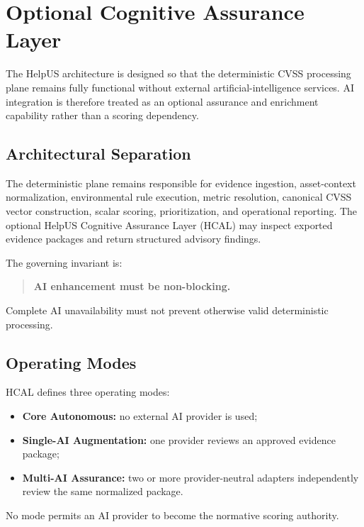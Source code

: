 \chapter{Optional Cognitive Assurance Layer}
\label{ch:optional_ai_assurance}

The HelpUS architecture is designed so that the deterministic CVSS processing plane remains fully functional without external artificial-intelligence services. AI integration is therefore treated as an optional assurance and enrichment capability rather than a scoring dependency.

\section{Architectural Separation}

The deterministic plane remains responsible for evidence ingestion, asset-context normalization, environmental rule execution, metric resolution, canonical CVSS vector construction, scalar scoring, prioritization, and operational reporting. The optional HelpUS Cognitive Assurance Layer (HCAL) may inspect exported evidence packages and return structured advisory findings.

The governing invariant is:

\begin{quote}
\textbf{AI enhancement must be non-blocking.}
\end{quote}

Complete AI unavailability must not prevent otherwise valid deterministic processing.

\section{Operating Modes}

HCAL defines three operating modes:

\begin{itemize}
  \item \textbf{Core Autonomous:} no external AI provider is used;
  \item \textbf{Single-AI Augmentation:} one provider reviews an approved evidence package;
  \item \textbf{Multi-AI Assurance:} two or more provider-neutral adapters independently review the same normalized package.
\end{itemize}

No mode permits an AI provider to become the normative scoring authority.

